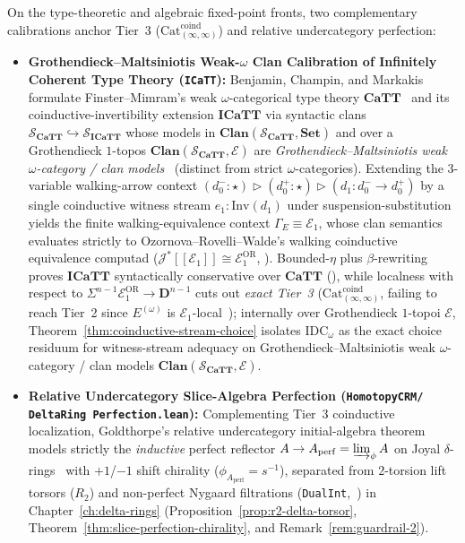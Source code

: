 On the type-theoretic and algebraic fixed-point fronts, two complementary calibrations anchor Tier~3 ($\mathrm{Cat}^{\mathrm{coind}}_{(\infty, \infty)}$) and relative undercategory perfection:
\begin{itemize}
  \item \textbf{Grothendieck--Maltsiniotis Weak-$\omega$ Clan Calibration of Infinitely Coherent Type Theory (\texttt{ICaTT}):} Benjamin, Champin, and Markakis~\cite{BCM26} formulate Finster--Mimram's weak $\omega$-categorical type theory $\mathbf{CaTT}$~\cite{FinsterMimram17} and its coinductive-invertibility extension $\mathbf{ICaTT}$ via syntactic clans $\mathcal{S}_{\mathbf{CaTT}} \hookrightarrow \mathcal{S}_{\mathbf{ICaTT}}$ whose models in $\mathbf{Clan}(\mathcal{S}_{\mathbf{CaTT}}, \mathbf{Set})$ and over a Grothendieck $1$-topos $\mathbf{Clan}(\mathcal{S}_{\mathbf{CaTT}}, \mathcal{E})$ are \emph{Grothendieck--Maltsiniotis weak $\omega$-category / clan models}~\cite{BCM26,ORW26} (distinct from strict $\omega$-categories). Extending the 3-variable walking-arrow context $(d_0^- : \star) \rhd (d_0^+ : \star) \rhd (d_1 : d_0^- \to d_0^+)$ by a single coinductive witness stream $e_1 : \mathrm{Inv}(d_1)$ under suspension-substitution yields the finite walking-equivalence context $\Gamma_E \equiv \mathcal{E}_1$, whose clan semantics evaluates strictly to Ozornova--Rovelli--Walde's walking coinductive equivalence computad ($\mathcal{J}^*[\![\mathcal{E}_1]\!] \cong \mathcal{E}_1^{\mathrm{OR}}$, \cite[Theorem~6.5]{BCM26}). Bounded-$\eta$ plus $\beta$-rewriting proves $\mathbf{ICaTT}$ syntactically conservative over $\mathbf{CaTT}$ (\cite[Proposition~4.6, Theorem~6.2]{BCM26}), while localness with respect to $\Sigma^{n-1}\mathcal{E}_1^{\mathrm{OR}} \to \mathbf{D}^{n-1}$ cuts out \emph{exact Tier~3} ($\mathrm{Cat}^{\mathrm{coind}}_{(\infty, \infty)}$, failing to reach Tier~2 since $E^{(\omega)}$ is $\mathcal{E}_1$-local~\cite[Corollary~5.56]{ORW26}); internally over Grothendieck $1$-topoi $\mathcal{E}$, Theorem~\ref{thm:coinductive-stream-choice} isolates $\mathrm{IDC}_\omega$ as the exact choice residuum for witness-stream adequacy on Grothendieck--Maltsiniotis weak $\omega$-category / clan models $\mathbf{Clan}(\mathcal{S}_{\mathbf{CaTT}}, \mathcal{E})$.

  \item \textbf{Relative Undercategory Slice-Algebra Perfection (\texttt{HomotopyCRM/ DeltaRing Perfection.lean}):} Complementing Tier~3 coinductive localization, Goldthorpe's relative undercategory initial-algebra theorem~\cite[Proposition~2.3.13]{Goldthorpe23} models strictly the \emph{inductive} perfect reflector $A \to A_{\mathrm{perf}} = \varinjlim_\phi A$ on Joyal $\delta$-rings~\cite{Joyal85} with $+1$/$-1$ shift chirality ($\phi_{A_{\mathrm{perf}}} = s^{-1}$), separated from $2$-torsion lift torsors ($R_2$) and non-perfect Nygaard filtrations (\texttt{DualInt},~\cite{BhattScholze22}) in Chapter~\ref{ch:delta-rings} (Proposition~\ref{prop:r2-delta-torsor}, Theorem~\ref{thm:slice-perfection-chirality}, and Remark~\ref{rem:guardrail-2}).
\end{itemize}

